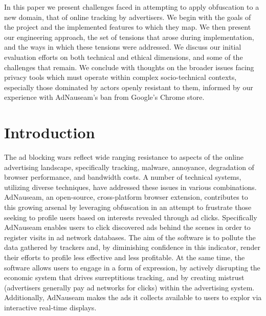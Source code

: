 \documentclass[conference]{IEEEtran}
\begin{document}
\indent In this paper we present challenges faced in attempting to apply obfuscation to a new domain, that of online tracking by advertisers. We begin with the goals of the project and the implemented features to which they map. We then present our engineering approach, the set of tensions that arose during implementation, and the ways in which these tensions were addressed. We discuss our initial evaluation efforts on both technical and ethical dimensions, and some of the challenges that remain. We conclude with thoughts on the broader issues facing privacy tools which must operate within complex socio-technical contexts, especially those dominated by actors openly resistant to them, informed by our experience with AdNauseam’s ban from Google's Chrome store.

%


\section{Introduction}

The ad blocking wars \cite{Murphy} reflect wide ranging resistance to aspects of the online advertising landscape, specifically tracking, malware, annoyance, degradation of browser performance, and bandwidth costs. A number of technical systems, utilizing diverse techniques, have addressed these issues in various combinations. AdNauseam, an open-source, cross-platform browser extension, contributes to this growing arsenal by leveraging obfuscation in an attempt to frustrate those seeking to profile users based on interests revealed through ad clicks. Specifically AdNauseam enables users to click discovered ads behind the scenes in order to register visits in ad network databases. The aim of the software is to pollute the data gathered by trackers and, by diminishing confidence in this  indicator, render their efforts to profile less effective and less profitable. At the same time, the software allows users to engage in a form of expression, by actively disrupting the economic system that drives surreptitious tracking, and by creating mistrust (advertisers generally pay ad networks for clicks) within the advertising system. Additionally, AdNauseam makes the ads it collects available to users to explor via interactive real-time displays.
\end{document}
